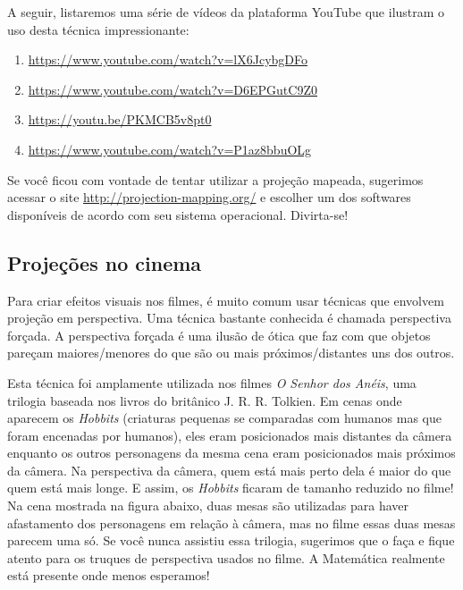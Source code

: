 A seguir, listaremos uma série de vídeos da plataforma YouTube que ilustram o uso desta técnica impressionante:
\begin{enumerate}
\item {} 
\url{https://www.youtube.com/watch?v=lX6JcybgDFo}

\item {} 
\url{https://www.youtube.com/watch?v=D6EPGutC9Z0}

\item {} 
\url{https://youtu.be/PKMCB5v8pt0}

\item {} 
\url{https://www.youtube.com/watch?v=P1az8bbuOLg}

\end{enumerate}

Se você ficou com vontade de tentar utilizar a projeção mapeada, sugerimos acessar o site \url{http://projection-mapping.org/} e escolher um dos softwares disponíveis de acordo com seu sistema operacional. Divirta-se!


\subsection{Projeções no cinema}
\label{\detokenize{GE301-A:projecoes-no-cinema}}\label{\detokenize{GE301-A:sub-cinema}}
Para criar efeitos visuais nos filmes, é muito comum usar técnicas que envolvem projeção em perspectiva. Uma técnica bastante conhecida é chamada perspectiva forçada. A perspectiva forçada é uma ilusão de ótica que faz com que objetos pareçam maiores/menores do que são ou mais próximos/distantes uns dos outros.

Esta técnica foi amplamente utilizada nos filmes \emph{O Senhor dos Anéis}, uma trilogia baseada nos livros do britânico J. R. R. Tolkien. Em cenas onde aparecem os \emph{Hobbits} (criaturas pequenas se comparadas com humanos mas que foram encenadas por humanos), eles eram posicionados mais distantes da câmera enquanto os outros personagens da mesma cena eram posicionados mais próximos da câmera. Na perspectiva da câmera, quem está mais perto dela é maior do que quem está mais longe. E assim, os \emph{Hobbits} ficaram de tamanho reduzido no filme! Na cena mostrada na figura abaixo, duas mesas são utilizadas para haver afastamento dos personagens em relação à câmera, mas no filme essas duas mesas parecem uma só. Se você nunca assistiu essa trilogia, sugerimos que o faça e fique atento para os truques de perspectiva usados no filme. A Matemática realmente está presente onde menos esperamos!

